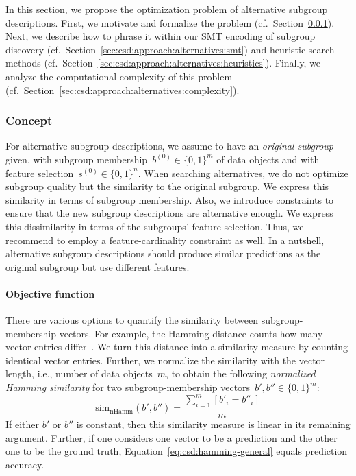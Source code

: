 \documentclass{article}
\theoremstyle{definition}
\begin{document}
In this section, we propose the optimization problem of alternative subgroup descriptions.
First, we motivate and formalize the problem (cf.~Section~\ref{sec:csd:approach:alternatives:concept}).
Next, we describe how to phrase it within our SMT encoding of subgroup discovery (cf.~Section~\ref{sec:csd:approach:alternatives:smt}) and heuristic search methods (cf.~Section~\ref{sec:csd:approach:alternatives:heuristics}).
Finally, we analyze the computational complexity of this problem (cf.~Section~\ref{sec:csd:approach:alternatives:complexity}).

\subsubsection{Concept}
\label{sec:csd:approach:alternatives:concept}

For alternative subgroup descriptions, we assume to have an \emph{original subgroup} given, with subgroup membership~$b^{(0)} \in \{0, 1\}^m$ of data objects and with feature selection~$s^{(0)} \in \{0, 1\}^n$.
When searching alternatives, we do not optimize subgroup quality but the similarity to the original subgroup. 
We express this similarity in terms of subgroup membership.
Also, we introduce constraints to ensure that the new subgroup descriptions are alternative enough.
We express this dissimilarity in terms of the subgroups' feature selection.
Thus, we recommend to employ a feature-cardinality constraint as well.
In a nutshell, alternative subgroup descriptions should produce similar predictions as the original subgroup but use different features.

\paragraph{Objective function}

There are various options to quantify the similarity between subgroup-membership vectors.
For example, the Hamming distance counts how many vector entries differ~\cite{choi2010survey}.
We turn this distance into a similarity measure by counting identical vector entries.
Further, we normalize the similarity with the vector length, i.e., number of data objects~$m$, to obtain the following \emph{normalized Hamming similarity} for two subgroup-membership vectors~$b', b'' \in \{0, 1\}^m$:
%
\begin{equation}
	\text{sim}_{\text{nHamm}}(b', b'') = \frac{\sum_{i=1}^{m} [b'_i = b''_i]}{m}
	\label{eq:csd:hamming-general}
\end{equation}
%
If either $b'$ or $b''$ is constant, then this similarity measure is linear in its remaining argument.
Further, if one considers one vector to be a prediction and the other one to be the ground truth, Equation~\ref{eq:csd:hamming-general} equals prediction accuracy.
\end{document}
